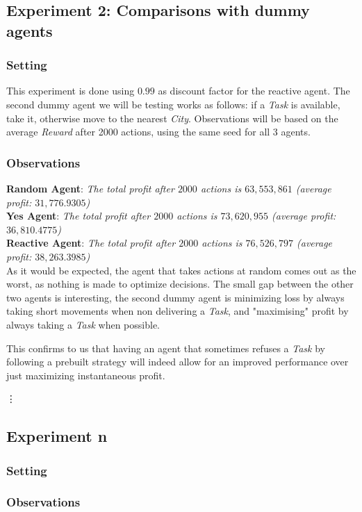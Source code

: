 \documentclass[11pt]{article}
\begin{document}
\subsection{Experiment 2: Comparisons with dummy agents}

\subsubsection{Setting}
This experiment is done using $0.99$ as discount factor for the reactive agent.
The second dummy agent we will be testing works as follows: if a \textit{Task} is available, take it, otherwise move to the nearest \textit{City}.
Observations will be based on the average \textit{Reward} after 2000 actions, using the same seed for all 3 agents.
\subsubsection{Observations}

\textbf{Random Agent}:
\textit{The total profit after $2000$ actions is $63,553,861$ (average profit: $31,776.9305$)}\\
\textbf{Yes Agent}:
\textit{The total profit after $2000$ actions is $73,620,955$ (average profit: $36,810.4775$)}\\
\textbf{Reactive Agent}:
\textit{The total profit after $2000$ actions is $76,526,797$ (average profit: $38,263.3985$)}\\

As it would be expected, the agent that takes actions at random comes out as the worst, as nothing is made to optimize decisions. The small gap between the other two agents is interesting, the second dummy agent is minimizing loss by always taking short movements when non delivering a \textit{Task}, and "maximising" profit by always taking a \textit{Task} when possible. 

This confirms to us that having an agent that sometimes refuses a \textit{Task} by following a prebuilt strategy will indeed allow for an improved performance over just maximizing instantaneous profit.

\vdots

\subsection{Experiment n}

\subsubsection{Setting}

\subsubsection{Observations}
\end{document}
